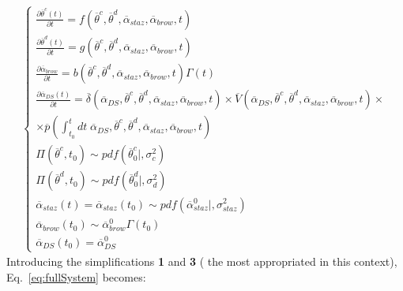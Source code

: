 \begin{equation}
\label{eq:fullSystem}
\begin{split}
\left\{\begin{matrix}
\frac{\partial  \overline{\theta}^{c}\left ( t \right )}{\partial t}=f\left ( \overline{\theta}^{c},\overline{\theta}^{d}, \overline{\alpha}_{staz} ,\overline{\alpha}_{brow},      t \right ) \\ 
\frac{\partial  \overline{\theta}^{d}\left ( t \right )}{\partial t}=g\left ( \overline{\theta}^{c},\overline{\theta}^{d},\overline{\alpha}_{staz},\overline{\alpha}_{brow},t \right )\\
\frac{\partial \overline{\alpha}_{brow} }{\partial t}=b\left ( \overline{\theta}^{c},\overline{\theta}^{d},\overline{\alpha}_{staz},\overline{\alpha}_{brow},t \right )\Gamma \left ( t \right ) \\
\frac{\partial  \overline{\alpha }_{DS}\left ( t \right )}{\partial t}=  \overline{\delta}\left ( \overline{\alpha }_{DS}, \overline{\theta}^{c},\overline{\theta}^{d},\overline{\alpha}_{staz},\overline{\alpha}_{brow},t \right ) \times \overline{V}\left ( \overline{\alpha }_{DS}, \overline{\theta}^{c},\overline{\theta}^{d},\overline{\alpha}_{staz},\overline{\alpha}_{brow},t \right ) \times 
\\ \times  \overline{p}\left ( \int_{t_{0}}^{t}  dt\;   \overline{\alpha }_{DS}, \overline{\theta}^{c},\overline{\theta}^{d},
  \overline{ \alpha}_{staz},\overline{\alpha}_{brow},t \right )
\\
\Pi \left ( \overline{\theta}^{c},t_{0} \right ) \sim pdf\left ( \overline{\theta}^{c}_{0}|,\sigma_{c}^{2} \right )\\ 
\Pi \left ( \overline{\theta}^{d},t_{0} \right ) \sim pdf\left ( \overline{\theta}^{d}_{0}|,\sigma_{d}^{2} \right ) \\
\overline{\alpha}_{staz}\left ( t \right )=\overline{\alpha}_{staz}\left ( t_{0} \right ) \sim pdf\left ( \overline{\alpha}_{staz}^{0}|, \sigma_{staz}^{2} \right ) \\
\overline{\alpha}_{brow}\left ( t_{0} \right ) \sim  \overline{\alpha}_{brow}^{0} \Gamma \left ( t_{0} \right ) \\
\overline{\alpha}_{DS} \left ( t_{0} \right ) = \overline{\alpha}_{DS} ^{0}
\end{matrix}\right.
\end{split}
\end{equation}
Introducing the simplifications \textbf{1} and \textbf{3} ( the most 
appropriated in this context), Eq.~\ref{eq:fullSystem} becomes:
